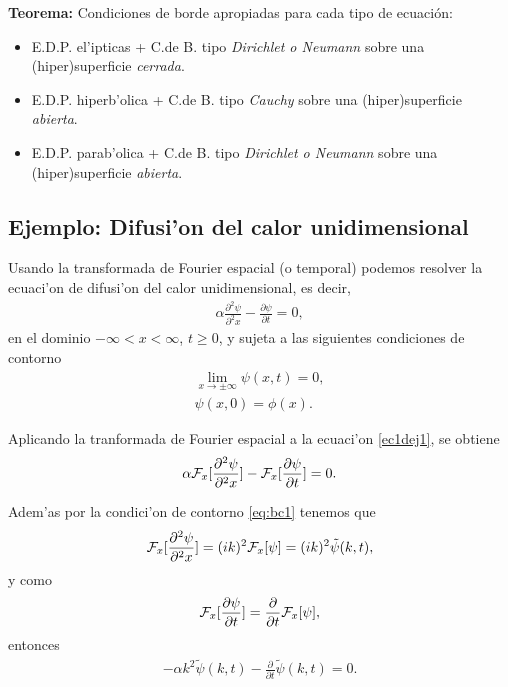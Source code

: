 \begin{tcolorbox}
\textbf{Teorema:} Condiciones de borde apropiadas para cada tipo de ecuación:

\begin{itemize}
\item E.D.P. el'ipticas +  C.de B. tipo \textit{Dirichlet o Neumann} sobre una (hiper)superficie \textit{cerrada}.
\item E.D.P. hiperb'olica + C.de B. tipo \textit{Cauchy} sobre una (hiper)superficie \textit{abierta}.
\item E.D.P. parab'olica + C.de B. tipo \textit{Dirichlet o Neumann} sobre una (hiper)superficie \textit{abierta}.
\end{itemize}
\end{tcolorbox}
\subsection{Ejemplo: Difusi'on del calor unidimensional}

Usando la transformada de Fourier espacial (o temporal) podemos resolver la ecuaci'on de difusi'on del calor unidimensional, es decir,
\begin{align}\label{ec1dej1}
\alpha \frac{\partial^2 \psi}{\partial^2 x}-\frac{\partial \psi}{\partial t}=0,
\end{align}
en el dominio $-\infty<x<\infty$, $t\ge 0$, y sujeta a las siguientes condiciones de contorno
\begin{align}
\lim_{x \rightarrow \pm \infty}\psi(x,t)=0,\label{eq:bc1}\\
\psi(x,0)=\phi(x).\label{eq:bc2}
\end{align}

Aplicando la tranformada de Fourier espacial a la ecuaci'on \eqref{ec1dej1}, se obtiene
\begin{align}
\alpha {\cal F}_{x}[\frac{\partial^2 \psi}{\partial^2 x}]-{\cal F}_{x}[\frac{\partial \psi}{\partial t}]=0.
\end{align}

Adem'as por la condici'on de contorno \eqref{eq:bc1} tenemos que
\begin{align}
{\cal F}_{x}[\frac{\partial^2 \psi}{\partial^2 x}]=(i k)^2 {\cal F}_{x}[\psi]=(i k)^2 \tilde{\psi}(k,t),
\end{align}
y como
\begin{align}
{\cal F}_{x}[\frac{\partial \psi}{\partial t}]=\frac{\partial}{\partial t}{\cal F}_{x}[\psi],
\end{align}
entonces
\begin{align}
-\alpha k^2 \tilde{\psi}(k,t)-\frac{\partial}{\partial t}\tilde{\psi}(k,t)=0.
\end{align}

